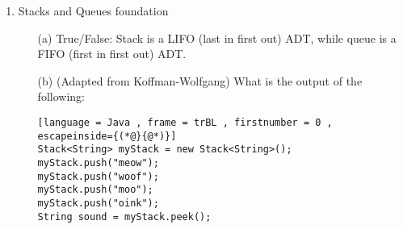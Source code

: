 \documentclass[letter]{article}
\begin{document}
\begin{enumerate}[1.]
\begin{itemize}
    \begin{lstlisting}[language = Java , frame = trBL , firstnumber = 0 , escapeinside={(*@}{@*)}]
public int potato(int numItems) {
    int someNum = 0;
    Node<E> temp = head;
    while (temp != null) {
        if ((temp.data).equals(item)) { //You can assume that equals() is O(1)
            break;
        }
        temp = temp.next;
        someNum++;
    }
    if (count >= numItems) {
        return -1;
    }
    return someNum;
}
    \end{lstlisting}

    \item [(b)] What is the runtime complexity of the following LinkedList method?

    \begin{lstlisting}[language = Java , frame = trBL , firstnumber = 0 , escapeinside={(*@}{@*)}]
public boolean strawberry(Node<E> node) {
    if (node.next != null) {
        return true;
    }
    return false;
}
    \end{lstlisting}

    \item [(c)] What is the runtime complexity of the following method? (This one is challenging, so feel free to ask for hints!)

    \begin{lstlisting}[language = Java , frame = trBL , firstnumber = 0 , escapeinside={(*@}{@*)}]
public Integer[] whatIsThis(int numItems) {
    Integer[] numArray = new Integer[numItems];
    for (int i=0; i < numItems; i++) {
        int sum = 0;
        for (int j = i; j < numItems; j++) {
            sum += j;
        }
        numArray[i] = sum;
    }
    return numArray;
}
    \end{lstlisting}
    \end{itemize}
\newpage
    \item Stacks and Queues foundation
    \begin{itemize}
        \item [(a)] True/False: Stack is a LIFO (last in first out) ADT, while queue is a FIFO (first in first out) ADT.
        \item [(b)] (Adapted from Koffman-Wolfgang) What is the output of the following:

    \begin{lstlisting}[language = Java , frame = trBL , firstnumber = 0 , escapeinside={(*@}{@*)}]
Stack<String> myStack = new Stack<String>();
myStack.push("meow");
myStack.push("woof");
myStack.push("moo");
myStack.push("oink");
String sound = myStack.peek();


\end{lstlisting}
\end{itemize}
\end{enumerate}
\end{document}
